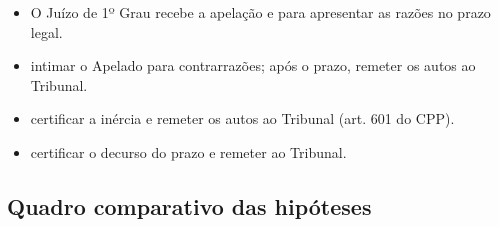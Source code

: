\documentclass[letterpaper,10pt,brazil]{sphinxmanual}
\begin{document}
\sphinxAtStartPar
{}
\begin{itemize}
\item {} 
\sphinxAtStartPar
O Juízo de 1º Grau recebe a apelação e  para apresentar as razões no prazo legal.

\item {} 
\sphinxAtStartPar
{} intimar o Apelado para contrarrazões; após o prazo, remeter os autos ao Tribunal.

\item {} 
\sphinxAtStartPar
{} certificar a inércia e remeter os autos ao Tribunal (art. 601 do CPP).

\item {} 
\sphinxAtStartPar
{} certificar o decurso do prazo e remeter ao Tribunal.

\end{itemize}


\subsection{Quadro comparativo das hipóteses}
\label{\detokenize{11decisao_recebimento_apelacao:quadro-comparativo-das-hipoteses}}
\end{document}
